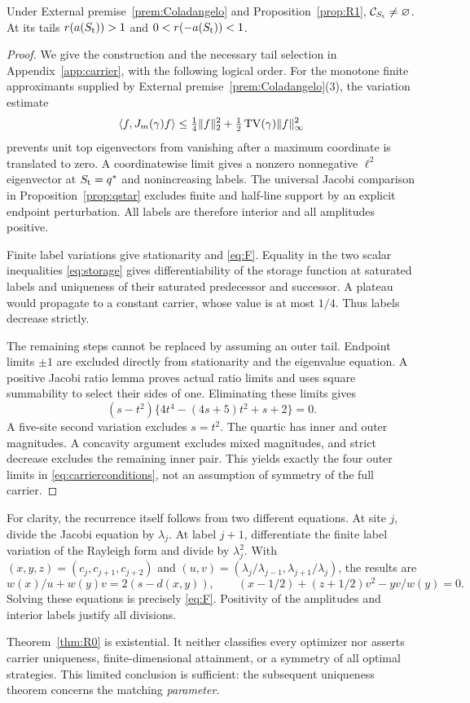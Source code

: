 \begin{theorem}\label{thm:R0}
Under External premise~\ref{prem:Coladangelo} and
Proposition~\ref{prop:R1}, \(\mathcal C_{S_{\mathrm t}}\ne\varnothing\).
At its tails \(r(a(S_{\mathrm t}))>1\) and \(0<r(-a(S_{\mathrm t}))<1\).
\end{theorem}
\begin{proof}
We give the construction and the necessary tail selection in
Appendix~\ref{app:carrier}, with the following logical order.
For the monotone finite approximants supplied by External
premise~\ref{prem:Coladangelo}(3), the variation estimate
\[
 \langle f,J_m(\gamma)f\rangle
 \le\tfrac14\|f\|_2^2+\tfrac12\operatorname{TV}(\gamma)\|f\|_\infty^2
\]
prevents unit top eigenvectors from vanishing after a maximum coordinate is
translated to zero. A coordinatewise limit gives a nonzero nonnegative
\(\ell^2\) eigenvector at \(S_{\mathrm t}=q^*\) and nonincreasing labels. The universal
Jacobi comparison in Proposition~\ref{prop:qstar} excludes finite and
half-line support by an explicit endpoint perturbation. All labels are
therefore interior and all amplitudes positive.

Finite label variations give stationarity and \eqref{eq:F}. Equality in the
two scalar inequalities \eqref{eq:storage} gives differentiability of the
storage function at saturated labels and uniqueness of their saturated
predecessor and successor. A plateau would propagate to a constant carrier,
whose value is at most \(1/4\). Thus labels decrease strictly.

The remaining steps cannot be replaced by assuming an outer tail. Endpoint
limits \(\pm1\) are excluded directly from stationarity and the eigenvalue
equation. A positive Jacobi ratio lemma proves actual ratio limits and uses
square summability to select their sides of one. Eliminating these limits
gives
\[
 (s-t^2)\{4t^4-(4s+5)t^2+s+2\}=0.
\]
A five-site second variation excludes \(s=t^2\). The quartic has inner and
outer magnitudes. A concavity argument excludes mixed magnitudes, and strict
decrease excludes the remaining inner pair. This yields exactly the four
outer limits in \eqref{eq:carrierconditions}, not an assumption of symmetry
of the full carrier.
\end{proof}

For clarity, the recurrence itself follows from two different equations.
At site \(j\), divide the Jacobi equation by \(\lambda_j\). At label
\(j+1\), differentiate the finite label variation of the Rayleigh form
and divide by \(\lambda_j^2\). With
\((x,y,z)=(c_j,c_{j+1},c_{j+2})\) and
\((u,v)=(\lambda_j/\lambda_{j-1},\lambda_{j+1}/\lambda_j)\), the results are
\begin{equation}\label{eq:stationarypair}
 w(x)/u+w(y)v=2(s-d(x,y)),\qquad
 (x-1/2)+(z+1/2)v^2-yv/w(y)=0.
\end{equation}
Solving these equations is precisely \eqref{eq:F}. Positivity of the
amplitudes and interior labels justify all divisions.

Theorem~\ref{thm:R0} is existential. It neither classifies every optimizer
nor asserts carrier uniqueness, finite-dimensional attainment, or a
symmetry of all optimal strategies. This limited conclusion is sufficient:
the subsequent uniqueness theorem concerns the matching \emph{parameter}.
